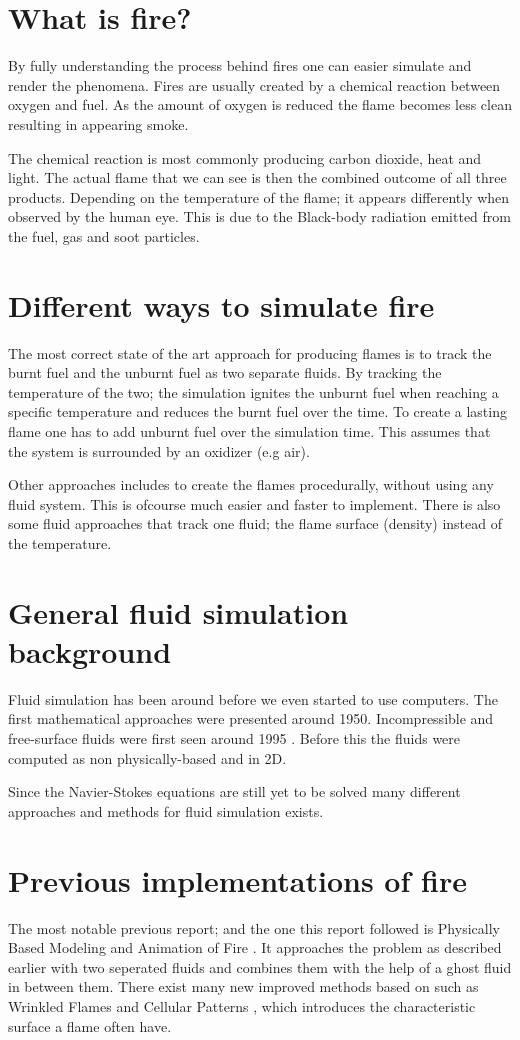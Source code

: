 \section{What is fire?}
By fully understanding the process behind fires one can easier simulate and render the phenomena. Fires are usually created by a chemical reaction between oxygen and fuel. As the amount of oxygen is reduced the flame becomes less clean resulting in appearing smoke. 

The chemical reaction is most commonly producing carbon dioxide, heat and light. The actual flame that we can see is then the combined outcome of all three products. Depending on the temperature of the flame; it appears differently when observed by the human eye. This is due to the Black-body radiation emitted from the fuel, gas and soot particles.

\section{Different ways to simulate fire}
The most correct state of the art approach for producing flames is to track the burnt fuel and the unburnt fuel as two separate fluids. By tracking the temperature of the two; the simulation ignites the unburnt fuel when reaching a specific temperature and reduces the burnt fuel over the time. To create a lasting flame one has to add unburnt fuel over the simulation time. This assumes that the system is surrounded by an oxidizer (e.g air).

Other approaches includes to create the flames procedurally, without using any fluid system. This is ofcourse much easier and faster to implement. There is also some fluid approaches that track one fluid; the flame surface (density) instead of the temperature.

\section{General fluid simulation background}
Fluid simulation has been around before we even started to use computers. The first mathematical approaches were presented around 1950. Incompressible and free-surface fluids were first seen around 1995 \cite{foster}. Before this the fluids were computed as non physically-based and in 2D.

Since the Navier-Stokes equations are still yet to be solved many different approaches and methods for fluid simulation exists.

\section{Previous implementations of fire}
The most notable previous report; and the one this report followed is Physically Based Modeling and Animation of Fire \cite{Nguyen02}. It approaches the problem as described earlier with two seperated fluids and combines them with the help of a ghost fluid in between them. There exist many new improved methods based on \cite{Nguyen02} such as Wrinkled Flames and Cellular Patterns \cite{wrinkled}, which introduces the characteristic surface a flame often have.